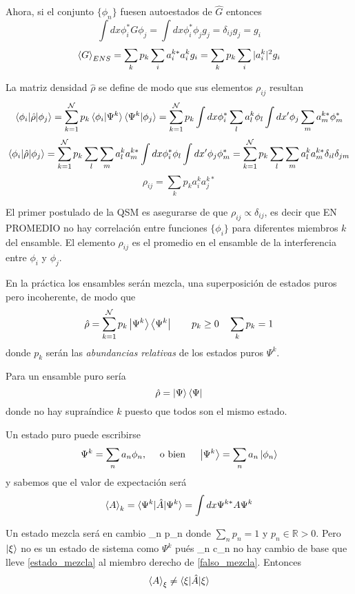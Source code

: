 \documentclass[10pt,oneside]{CBFT_book}
\begin{document}
Ahora, si el conjunto $\{ \phi_n \}$ fuesen autoestados de $\hat{G}$ entonces 
\[
	\int dx \phi_i^* G \phi_j = \int dx \phi_i^* \phi_j g_j = \delta_{ij} g_j = g_i
\]
\[
	\braket{G}_{ENS} = \sum_k p_k \sum_i a_i^{k*}  a_i^k g_i = 
	\sum_k p_k \sum_i |a_i^k|^2 g_i
\]

La matriz densidad $\hat{\rho}$ se define de modo que sus elementos $\rho_{ij}$ resultan 
\[
	\braket{\phi_i|\hat{\rho}|\phi_j} = \sum_{k=1}^\mathcal{N} p_k \braket{\phi_i|\Psi^k} \braket{\Psi^k|\phi_j} =
	\sum_{k=1}^\mathcal{N} p_k \int dx \phi^*_i \sum_l a_l^k \phi_l \int dx' \phi_j \sum_m a_m^{k*} \phi_m^*
\]
\[
	\braket{\phi_i|\hat{\rho}|\phi_j} = 
	\sum_{k=1}^\mathcal{N} p_k \sum_l \sum_m a_l^k a_m^{k*} \int dx \phi^*_i \phi_l \int dx' \phi_j \phi_m^* =
	\sum_{k=1}^\mathcal{N} p_k \sum_l \sum_m a_l^k a_m^{k*} \delta_{il}\delta_{jm}
\]
\[
	\rho_{ij} = \sum_k p_k a_i^k a_j^{k*}
\]

El primer postulado de la QSM es asegurarse de que $\rho_{ij} \propto \delta_{ij} $, es decir que
EN PROMEDIO no hay correlación entre funciones $\{ \phi_i \}$ para diferentes miembros $k$ del ensamble.
El elemento $\rho_{ij}$ es el promedio en el ensamble de la interferencia entre $\phi_i$ y $\phi_j$.


En la práctica los ensambles serán mezcla, una superposición de estados puros pero incoherente, de modo
que 
\[
	\hat{\rho} = \sum_{k=1}^\mathcal{N} p_k \Ket{\Psi^k}\Bra{\Psi^k} \qquad p_k \geq 0 \quad \sum_k p_k = 1 
\]
donde $p_k$ serán las {\it abundancias relativas} de los estados puros $\Psi^k$.

Para un ensamble puro sería
\[
	\hat{\rho} = \Ket{\Psi}\Bra{\Psi}
\]
donde no hay supraíndice $k$ puesto que todos son el mismo estado.

Un estado puro puede escribirse 
\[
	\Psi^k = \sum_n a_n \phi_n, \quad \text{ o bien }\quad \Ket{\Psi^k} = \sum_n a_n \Ket{\phi_n}
\]
y sabemos que el valor de expectación será
\[
	\braket{A}_k = \braket{\Psi^k|\hat{A}|\Psi^k} = \int dx \Psi^{k*} A \Psi^k
\]

Un estado mezcla será en cambio 
\be
	\Ket{\xi} \cong \sum_n p_n
	\label{estado_mezcla}	
\ee
donde $\sum_n p_n =1$ y $p_n \in \mathbb{R}>0$. Pero $\Ket{\xi} $ no es un estado de sistema como $\Psi^k$ pués
\be
	\Ket{\xi} \neq \sum_n c_n
	\label{falso_mezcla}
\ee
no hay cambio de base que lleve \eqref{estado_mezcla} al miembro derecho de \eqref{falso_mezcla}.
Entonces
\[
	\braket{A}_\xi \neq \braket{\xi|\hat{A}|\xi}
\]
\end{document}
